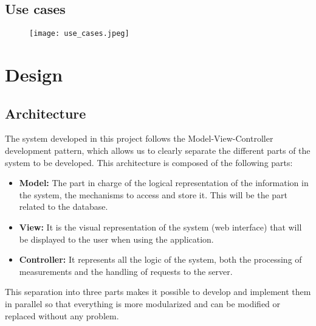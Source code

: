 \subsection{Use cases}\label{subsec:use-cases}
\begin{figure}[H]
	{\texttt{[image: use\_cases.jpeg]}}
\end{figure}

\section{Design}\label{sec:design}
\subsection{Architecture}\label{subsec:architecture}
The system developed in this project follows the Model-View-Controller development pattern, which allows us to clearly separate the different parts of the system to be developed. This architecture is composed of the following parts:
\begin{itemize}
	\item \textbf{Model:} The part in charge of the logical representation of the information in the system, the mechanisms to access and store it. This will be the part related to the database.
	\item \textbf{View:} It is the visual representation of the system (web interface) that will be displayed to the user when using the application.
	\item \textbf{Controller:} It represents all the logic of the system, both the processing of measurements and the handling of requests to the server.
\end{itemize}

This separation into three parts makes it possible to develop and implement them in parallel so that everything is more modularized and can be modified or replaced without any problem.

